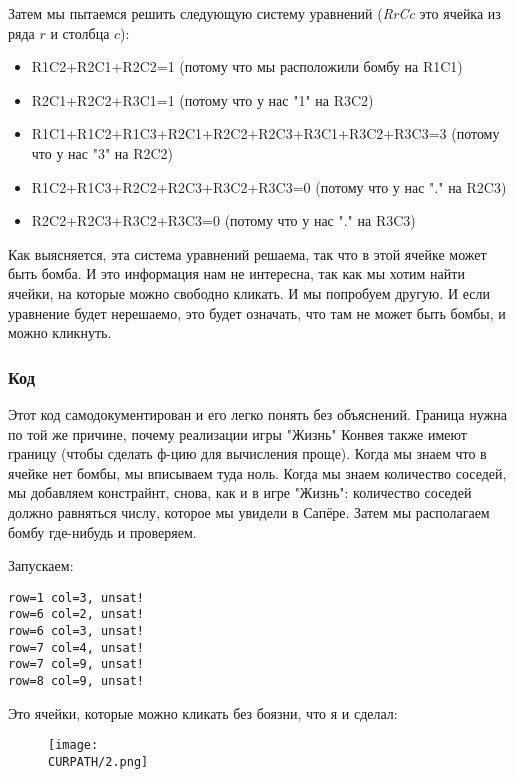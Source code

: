 Затем мы пытаемся решить следующую систему уравнений (\textit{RrCc} это ячейка из ряда $r$ и столбца $c$):

\begin{itemize}
\item R1C2+R2C1+R2C2=1                               (потому что мы расположили бомбу на R1C1)	
\item R2C1+R2C2+R3C1=1                               (потому что у нас "1" на R3C2)	
\item R1C1+R1C2+R1C3+R2C1+R2C2+R2C3+R3C1+R3C2+R3C3=3 (потому что у нас "3" на R2C2)	
\item R1C2+R1C3+R2C2+R2C3+R3C2+R3C3=0                (потому что у нас "." на R2C3)	
\item R2C2+R2C3+R3C2+R3C3=0                          (потому что у нас "." на R3C3)
\end{itemize}

Как выясняется, эта система уравнений решаема, так что в этой ячейке может быть бомба.
И это информация нам не интересна, так как мы хотим найти ячейки, на которые можно свободно кликать.
И мы попробуем другую.
И если уравнение будет нерешаемо, это будет означать, что там не может быть бомбы, и можно кликнуть.

\subsubsection{Код}



Этот код самодокументирован и его легко понять без объяснений.
Граница нужна по той же причине, почему реализации игры "Жизнь" Конвея также имеют границу (чтобы сделать
ф-цию для вычисления проще).
Когда мы знаем что в ячейке нет бомбы, мы вписываем туда ноль.
Когда мы знаем количество соседей, мы добавляем констрайнт, снова, как и в игре "Жизнь": количество соседей
должно равняться числу, которое мы увидели в Сапёре.
Затем мы располагаем бомбу где-нибудь и проверяем.

Запускаем:

\begin{lstlisting}
row=1 col=3, unsat!
row=6 col=2, unsat!
row=6 col=3, unsat!
row=7 col=4, unsat!
row=7 col=9, unsat!
row=8 col=9, unsat!
\end{lstlisting}

Это ячейки, которые можно кликать без боязни, что я и сделал:

\begin{figure}[H]
\centering
\texttt{[image: \\CURPATH/2.png]}
\end{figure}

